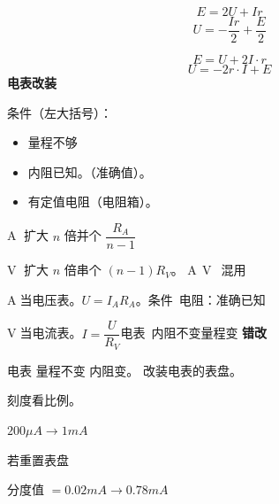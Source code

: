 
\[ E=2U+Ir \]
\[ U=-\frac{Ir}{2}+\frac{E}{2} \]

\[ E=U+2I\cdot r \]
\[ U=-2r\cdot I+E \]
\textbf{电表改装} %

条件（左大括号）：
\begin{itemize}
\item 量程不够
\item 内阻已知。（准确值）。
\item 有定值电阻（电阻箱）。
\end{itemize}

\textcircled{A} 扩大 $n$ 倍\quad 并个 $\dfrac{R_A}{n-1}$

\textcircled{V} 扩大 $n$ 倍\quad 串个 $(n-1)R_V$。
\textcircled{A}\,\textcircled{V}\ 混用 %


\textcircled{A}当电压表。$U=I_AR_A$。\quad 条件\ 电阻：准确已知


\textcircled{V}当电流表。$I=\dfrac{U}{R_V}$\quad 电表\ 内阻不变量程变
\textbf{错改} %



电表 量程不变 内阻变。
改装电表的表盘。

刻度看比例。


$200\unit{\mu A}\to 1\unit{mA}$

若重置表盘

分度值 $=0.02\unit{mA}\to 0.78\unit{mA}$

